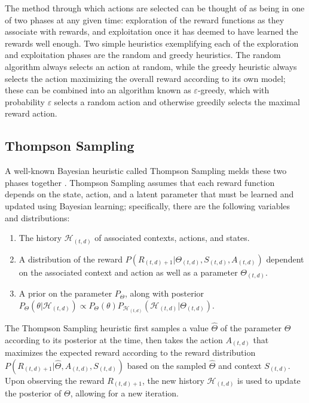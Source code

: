 The method through which actions are selected can be thought of as being in one of two phases at any given time: exploration of the reward functions as they associate with rewards, and exploitation once it has deemed to have learned the rewards well enough.  Two simple heuristics exemplifying each of the exploration and exploitation phases are the random and greedy heuristics.  The random algorithm always selects an action at random, while the greedy heuristic always selects the action maximizing the overall reward according to its own model; these can be combined into an algorithm known as $\varepsilon$-greedy, which with probability $\varepsilon$ selects a random action and otherwise greedily selects the maximal reward action.  


\subsection{Thompson Sampling}

A well-known Bayesian heuristic called Thompson Sampling melds these two phases together \citep{Agrawal2012}.  Thompson Sampling assumes that each reward function depends on the state, action, and a latent parameter that must be learned and updated using Bayesian learning; specifically, there are the following variables and distributions:
\begin{enumerate}
 	\item The history $\mathcal{H}_{(t,d)}$ of associated contexts, actions, and states.
 	\item A distribution of the reward $P\left(R_{(t,d)+1} |  \Theta_{(t,d)}, S_{(t,d)}, A_{(t,d)} \right)$ dependent on the associated context and action as well as a parameter $\Theta_{(t,d)}$.
 	\item A prior on the parameter $P_\Theta$, along with posterior $P_\Theta\left(\theta | \mathcal{H}_{(t,d)}\right) \propto P_\Theta(\theta) P_{\mathcal{H}_{(t,d)}}\left(\mathcal{H}_{(t,d)} | \Theta_{(t,d)} \right)$.
 \end{enumerate}

The Thompson Sampling heuristic first samples a value $\hat{\Theta}$ of the parameter $\Theta$ according to its posterior at the time, then takes the action $A_{(t,d)}$ that maximizes the expected reward according to the reward distribution $P\left(R_{(t,d)+1} | \hat{\Theta},A_{(t,d)},S_{(t,d)}\right)$ based on the sampled $\hat{\Theta}$ and context $S_{(t,d)}$.  Upon observing the reward $R_{(t,d)+1}$, the new history $\mathcal{H}_{(t,d)}$ is used to update the posterior of $\Theta$, allowing for a new iteration.


